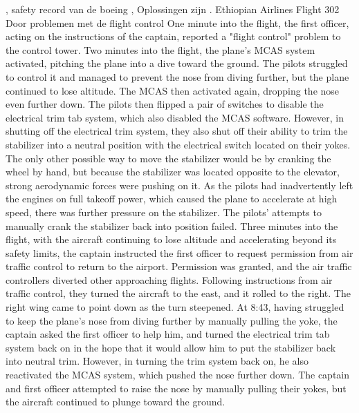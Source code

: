 \cite{travis18042019737maxsoftwaredevop},
safety record van de boeing
\cite{touitou11032019737tragedies},
 Oplossingen zijn \cite{caa737modifications}. 
 Ethiopian Airlines Flight 302
 Door problemen met de flight control
 One minute into the flight, the first officer, acting on the instructions of the captain, reported a "flight control" problem to the control tower.
 Two minutes into the flight, the plane's MCAS system activated, pitching the plane into a dive toward the ground. The pilots struggled to control it and managed to prevent the nose from diving further, but the plane continued to lose altitude.
 The MCAS then activated again, dropping the nose even further down. The pilots then flipped a pair of switches to disable the electrical trim tab system, which also disabled the MCAS software. However, in shutting off the electrical trim system, they also shut off their ability to trim the stabilizer into a neutral position with the electrical switch located on their yokes. The only other possible way to move the stabilizer would be by cranking the wheel by hand, but because the stabilizer was located opposite to the elevator, strong aerodynamic forces were pushing on it.
 As the pilots had inadvertently left the engines on full takeoff power, which caused the plane to accelerate at high speed, there was further pressure on the stabilizer. The pilots' attempts to manually crank the stabilizer back into position failed.
 Three minutes into the flight, with the aircraft continuing to lose altitude and accelerating beyond its safety limits, the captain instructed the first officer to request permission from air traffic control to return to the airport. Permission was granted, and the air traffic controllers diverted other approaching flights. Following instructions from air traffic control, they turned the aircraft to the east, and it rolled to the right. The right wing came to point down as the turn steepened.
 At 8:43, having struggled to keep the plane's nose from diving further by manually pulling the yoke, the captain asked the first officer to help him, and turned the electrical trim tab system back on in the hope that it would allow him to put the stabilizer back into neutral trim. However, in turning the trim system back on, he also reactivated the MCAS system, which pushed the nose further down. The captain and first officer attempted to raise the nose by manually pulling their yokes, but the aircraft continued to plunge toward the ground.
 \cite{caliskan09112013747boeingkalman}
 \cite{gates18112020boeingcrisis}
